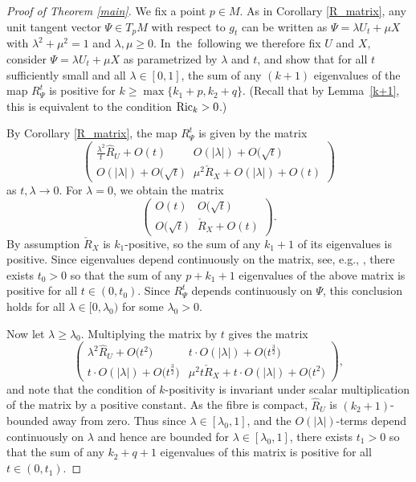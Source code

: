 \begin{proof}[Proof of Theorem \ref{main}]
	We fix a point $p\in M$. As in Corollary \ref{R_matrix}, any unit tangent vector $\Psi\in T_p M$ with respect to $g_t$ can be written as $\Psi=\lambda U_t+\mu X$ with $\lambda^2+\mu^2=1$ and $\lambda,\mu\geq 0$. In~the~following we therefore fix $U$ and $X$, consider $\Psi=\lambda U_t+\mu X$ as parametrized by $\lambda $ and $t$, and show that for all $t$ sufficiently small and all $\lambda\in[0,1]$, the sum of any $(k+1)$ eigenvalues of the map $R^t_\Psi$ is positive for $k\geq\max\{k_1+p,k_2+q \}$. (Recall that by Lemma~\ref{k+1}, this is equivalent to the condition ${\rm Ric}_k>0$.)
	
	By Corollary \ref{R_matrix}, the map $R_\Psi^t$ is given by the matrix
	\[
	\begin{pmatrix}
		\frac{\lambda^2}{t}\hat{R}_U+O(t) & O(|\lambda|)+O\bigl(\sqrt{t}\bigr)\\
		O(|\lambda|)+O\bigl(\sqrt{t}\bigr) & \mu^2 \check{R}_X+O(|\lambda|)+O(t)
	\end{pmatrix}
	\]
	as $t,\lambda\to0$. For $\lambda=0$, we obtain the matrix
	\[
	\begin{pmatrix}
		O(t) & O\bigl(\sqrt{t}\bigr)\\
		O\bigl(\sqrt{t}\bigr) & \check{R}_X+O(t)
	\end{pmatrix}.
	\]
	By assumption $\check{R}_X$ is $k_1$-positive, so the sum of any $k_1+1$ of its eigenvalues is positive. Since eigenvalues depend continuously on the matrix, see, e.g., \cite[Corollary VI.1.6]{Bh}, there exists $t_0>0$ so that the sum of any $p+k_1+1$ eigenvalues of the above matrix is positive for all $t\in(0,t_0)$. Since $R^t_\Psi$ depends continuously on $\Psi$, this conclusion holds for all $\lambda\in[0,\lambda_0)$ for some $\lambda_0>0$.
	
	Now let $\lambda\geq\lambda_0$. Multiplying the matrix by $t$ gives the matrix
	\[
	\begin{pmatrix}
		\lambda^2 \hat{R}_U+O\bigl(t^2\bigr) & t\cdot O(|\lambda|)+O\bigl(t^{\frac{3}{2} }\bigr)\\
		t\cdot O(|\lambda|)+O\bigl(t^{\frac{3}{2}}\bigr) & \mu^2t \check{R}_X+t\cdot O(|\lambda|)+O\bigl(t^2\bigr)
	\end{pmatrix},
	\]
	and note that the condition of $k$-positivity is invariant under scalar multiplication of the matrix by a positive constant. As the fibre is compact, $\hat{R}_U$ is $(k_2+1)$-bounded away from zero. Thus since $\lambda\in[\lambda_0,1]$, and the $O(|\lambda|)$-terms depend continuously on $\lambda$ and hence are bounded for $\lambda\in[\lambda_0,1]$, there exists $t_1>0$ so that the sum of any $k_2+q+1$ eigenvalues of this matrix is positive for all $t\in(0,t_1)$. %
	

\end{proof}

